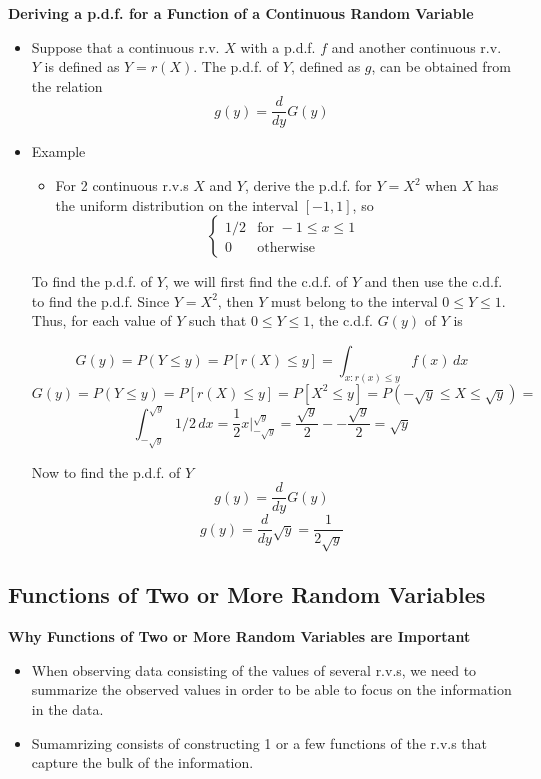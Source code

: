 \documentclass[11pt]{article}
\begin{document}
\textbf{Deriving a p.d.f. for a Function of a Continuous Random Variable}
\begin{itemize}
    \item Suppose that a continuous r.v. $X$ with a p.d.f. $f$ and another continuous r.v. $Y$
    is defined as $Y=r(X)$. The p.d.f. of $Y$, defined as $g$, can be obtained from the 
    relation
    \[g(y) = \frac{d}{dy} G(y)\]
    \item Example 
    \begin{itemize}
        \item For 2 continuous r.v.s $X$ and $Y$, derive the p.d.f. for $Y=X^2$ when $X$ has
        the uniform distribution on the interval $[-1,1]$, so
        \[
        \begin{cases}
            1/2 & \text{for } -1 \le x \le 1 \\
            0 & \text{otherwise}
        \end{cases}    
        \]
    \end{itemize}
    To find the p.d.f. of $Y$, we will first find the c.d.f. of $Y$ and then use the c.d.f. to 
    find the p.d.f.
    Since $Y=X^2$, then $Y$ must belong to the interval $0 \le Y \le 1$. Thus, for each value 
    of $Y$ such that $0 \le Y \le 1$, the c.d.f. $G(y)$ of $Y$ is 
    
    \[G(y) = P(Y \le y) = P[r(X) \le y] = \int_{{x:r(x) \le y}} f(x) \,dx \]
    \[G(y) = P(Y \le y) = P[r(X) \le y] = P[X^2 \le y] = P(-\sqrt{y} \le X \le \sqrt{y}) =\] 
    \[\int_{-\sqrt{y}}^{\sqrt{y}} 1/2 \,dx = \frac{1}{2}x |_{-\sqrt{y}}^{\sqrt{y}} = 
    \frac{\sqrt{y}}{2} - -\frac{\sqrt{y}}{2} = \sqrt{y}\]
    
    Now to find the p.d.f. of $Y$
    \[g(y) = \frac{d}{dy} G(y)\]
    \[g(y) = \frac{d}{dy} \sqrt{y} = \frac{1}{2\sqrt{y}}\]
\end{itemize}

\subsection{Functions of Two or More Random Variables}

\textbf{Why Functions of Two or More Random Variables are Important}
\begin{itemize}
    \item When observing data consisting of the values of several r.v.s, we need to summarize 
    the observed values in order to be able to focus on the information in the data. 
    \item Sumamrizing consists of constructing 1 or a few functions of the r.v.s that capture
    the bulk of the information. 
\end{itemize}
\end{document}
